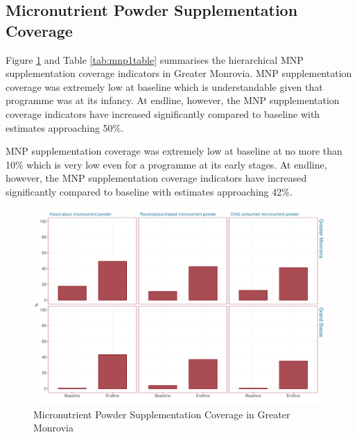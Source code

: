 \documentclass[12pt,a4paper]{article}
\begin{document}
\newpage

\hypertarget{micronutrient-powder-supplementation-coverage}{%
\subsection{Micronutrient Powder Supplementation Coverage}\label{micronutrient-powder-supplementation-coverage}}

Figure \ref{fig:mnp1plot} and Table \ref{tab:mnp1table} summarises the hierarchical MNP supplementation coverage indicators in Greater Monrovia. MNP supplementation coverage was extremely low at baseline which is understandable given that programme was at its infancy. At endline, however, the MNP supplementation coverage indicators have increased significantly compared to baseline with estimates approaching 50\%.

MNP supplementation coverage was extremely low at baseline at no more than 10\% which is very low even for a programme at its early stages. At endline, however, the MNP supplementation coverage indicators have increased significantly compared to baseline with estimates approaching 42\%.

\begin{figure}[H]

{\centering \includegraphics{liberiaCoverageFinalReport_files/figure-latex/mnp1plot-1} 

}

\caption{Micronutrient Powder Supplementation Coverage in Greater Monrovia}\label{fig:mnp1plot}
\end{figure}
\end{document}
